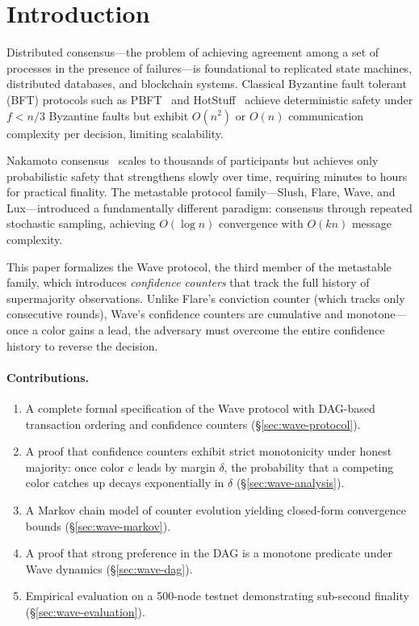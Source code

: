 \section{Introduction}

\label{sec:wave-introduction}

Distributed consensus---the problem of achieving agreement among a set of processes in
the presence of failures---is foundational to replicated state machines, distributed
databases, and blockchain systems. Classical Byzantine fault tolerant (BFT) protocols
such as PBFT~\cite{castro1999practical} and HotStuff~\cite{yin2019hotstuff} achieve
deterministic safety under $f < n/3$ Byzantine faults but exhibit $O(n^2)$ or $O(n)$
communication complexity per decision, limiting scalability.

Nakamoto consensus~\cite{nakamoto2008bitcoin} scales to thousands of participants but
achieves only probabilistic safety that strengthens slowly over time, requiring minutes
to hours for practical finality. The metastable protocol family---Slush, Flare, Wave,
and Lux---introduced a fundamentally different paradigm: consensus through repeated
stochastic sampling, achieving $O(\log n)$ convergence with $O(kn)$ message complexity.

This paper formalizes the Wave protocol, the third member of the metastable family,
which introduces \emph{confidence counters} that track the full history of supermajority
observations. Unlike Flare's conviction counter (which tracks only consecutive rounds),
Wave's confidence counters are cumulative and monotone---once a color gains a lead,
the adversary must overcome the entire confidence history to reverse the decision.

\paragraph{Contributions.}
\begin{enumerate}[nosep]
\item A complete formal specification of the Wave protocol with DAG-based transaction
ordering and confidence counters (\S\ref{sec:wave-protocol}).
\item A proof that confidence counters exhibit strict monotonicity under honest majority:
once color $c$ leads by margin $\delta$, the probability that a competing color catches
up decays exponentially in $\delta$ (\S\ref{sec:wave-analysis}).
\item A Markov chain model of counter evolution yielding closed-form convergence bounds
(\S\ref{sec:wave-markov}).
\item A proof that strong preference in the DAG is a monotone predicate under Wave
dynamics (\S\ref{sec:wave-dag}).
\item Empirical evaluation on a 500-node testnet demonstrating sub-second finality
(\S\ref{sec:wave-evaluation}).
\end{enumerate}

